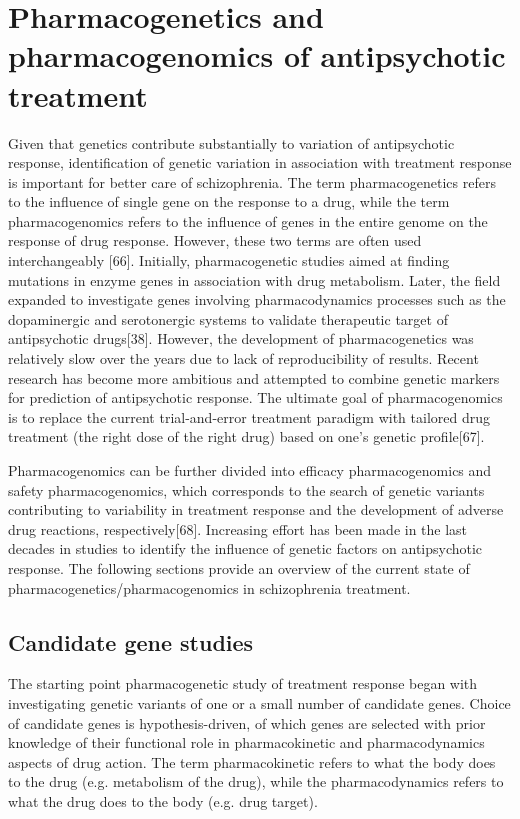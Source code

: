 \documentclass[12pt]{report}
\begin{document}
			\section{Pharmacogenetics and pharmacogenomics of antipsychotic treatment}
				Given that genetics contribute substantially to variation of antipsychotic response, identification of genetic variation in association with treatment response is important for better care of schizophrenia. 
				The term pharmacogenetics refers to the influence of single gene on the response to a drug, while the term pharmacogenomics refers to the influence of genes in the entire genome on the response of drug response.
				However, these two terms are often used interchangeably [66]. 
				Initially, pharmacogenetic studies aimed at finding mutations in enzyme genes in association with drug metabolism. 
				Later, the field expanded to investigate genes involving pharmacodynamics processes such as the dopaminergic and serotonergic systems to validate therapeutic target of antipsychotic drugs[38].
				However, the development of pharmacogenetics was relatively slow over the years due to lack of reproducibility of results. 
				Recent research has become more ambitious and attempted to combine genetic markers for prediction of antipsychotic response. 
				The ultimate goal of pharmacogenomics is to replace the current trial-and-error treatment paradigm with tailored drug treatment (the right dose of the right drug) based on one’s genetic profile[67].
				 
				Pharmacogenomics can be further divided into efficacy pharmacogenomics and safety pharmacogenomics, which corresponds to the search of genetic variants contributing to variability in treatment response and the development of adverse drug reactions, respectively[68]. 
				Increasing effort has been made in the last decades in studies to identify the influence of genetic factors on antipsychotic response. 
				The following sections provide an overview of the current state of pharmacogenetics/pharmacogenomics in schizophrenia treatment. 
			\subsection{Candidate gene studies} 
				The starting point pharmacogenetic study of treatment response began with investigating genetic variants of one or a small number of candidate genes. 
				Choice of candidate genes is hypothesis-driven, of which genes are selected with prior knowledge of their functional role in pharmacokinetic and pharmacodynamics aspects of drug action. 
				The term pharmacokinetic refers to what the body does to the drug (e.g. metabolism of the drug), while the pharmacodynamics refers to what the drug does to the body (e.g. drug target). 
\end{document}
